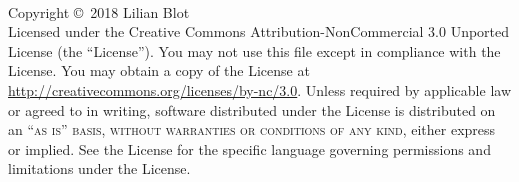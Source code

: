 \documentclass[12pt, fleqn]{book} %
\begin{document}


\begingroup
\thispagestyle{empty}
\vfill
\endgroup



\newpage
~\vfill
\thispagestyle{empty}

\noindent Copyright \copyright\ 2018 Lilian Blot\\ %

%

\noindent Licensed under the Creative Commons Attribution-NonCommercial 3.0 Unported License (the ``License''). You may not use this file except in compliance with the License. You may obtain a copy of the License at \url{http://creativecommons.org/licenses/by-nc/3.0}. Unless required by applicable law or agreed to in writing, software distributed under the License is distributed on an \textsc{``as is'' basis, without warranties or conditions of any kind}, either express or implied. See the License for the specific language governing permissions and limitations under the License.\\ %
\end{document}
